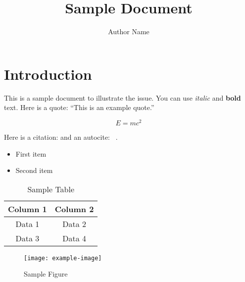 \documentclass{article}
\title{Sample Document}
\author{Author Name}
\begin{document}
\maketitle
\section{Introduction}
This is a sample document to illustrate the issue. You can use \textit{italic} and \textbf{bold} text. Here is a quote: \enquote{This is an example quote.}

\begin{equation}
E = mc^2
\end{equation}

Here is a citation: \cite[23]{einstein1935can} and an autocite: ~\autocite[23]{einstein1935can}.

\begin{itemize}
    \item First item
    \item Second item
\end{itemize}

\begin{table}[h]
    \centering
    \begin{tabular}{|c|c|}
        \hline
        Column 1 & Column 2 \\
        \hline
        Data 1 & Data 2 \\
        Data 3 & Data 4 \\
        \hline
    \end{tabular}
    \caption{Sample Table}
    \label{tab:sample}
\end{table}

\begin{figure}[h]
    \centering
    \texttt{[image: example-image]}
    \caption{Sample Figure}
    \label{fig:sample}
\end{figure}
\end{document}
